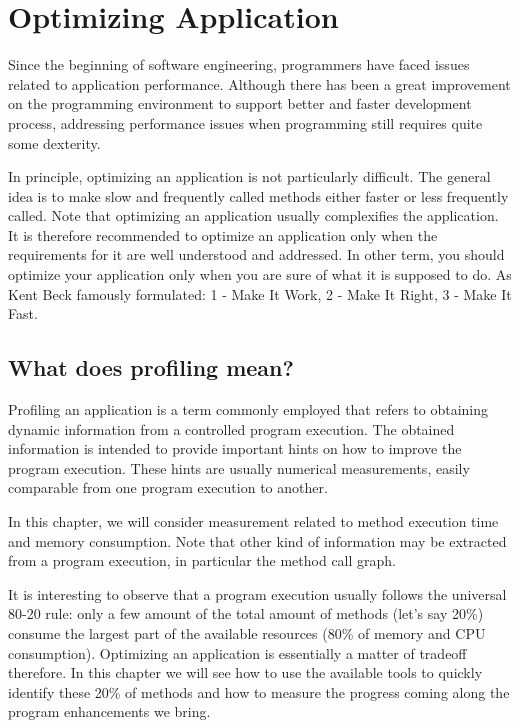 \documentclass[a4paper,10pt,twoside]{book}
\begin{document}


\chapter{Optimizing Application}

Since the beginning of software engineering, programmers have faced issues related to application performance. Although there has been a great improvement on the programming environment to support better and faster development process, addressing performance issues when programming still requires quite some dexterity.

In principle, optimizing an application is not particularly difficult. The general idea is to make slow and frequently called methods either faster or less frequently called. Note that optimizing an application usually complexifies the application. It is therefore recommended to optimize an application only when the requirements for it are well understood and addressed. In other term, you should optimize your application only when you are sure of what it is supposed to do. As Kent Beck famously formulated: 1 - Make It Work, 2 - Make It Right, 3 - Make It Fast.

\section{What does profiling mean?} 
Profiling an application is a term commonly employed that refers to obtaining dynamic information from a controlled program execution. The obtained information is intended to provide important hints on how to improve the program execution. These hints are usually numerical measurements, easily comparable from one program execution to another.

In this chapter, we will consider measurement related to method execution time and memory consumption. Note that other kind of information may be extracted from a program execution, in particular the method call graph.

It is interesting to observe that a program execution usually follows the universal 80-20 rule: only a few amount of the total amount of methods (let's say 20\%) consume the largest part of the available resources (80\% of memory and CPU consumption). Optimizing an application is essentially a matter of tradeoff therefore. In this chapter we will see how to use the available tools to quickly identify these 20\% of methods and how to measure the progress coming along the program enhancements we bring.
\end{document}
